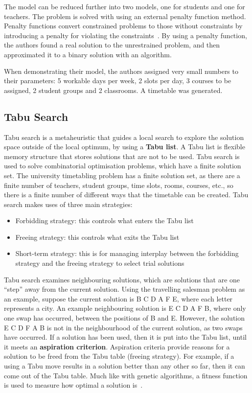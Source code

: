The model can be reduced further into two models, one for students and one for
teachers.
The problem is solved with using an external penalty function method. Penalty
functions convert constrained problems to those without constraints by
introducing a penalty for violating the constraints~\cite{penalty_function}.
By using a penalty function, the authors found a real solution
to the unrestrained problem, and then approximated it to a binary solution with
an algorithm.

When demonstrating their model, the authors assigned very small numbers to their
parameters: 5 workable days per week, 2 slots per day, 3 courses to be assigned,
2 student groups and 2 classrooms. A timetable was generated.

\subsection{Tabu Search}

Tabu search is a metaheuristic that guides a local search to explore the
solution space outside of the local optimum, by using a \textbf{Tabu list}.
A Tabu list is flexible memory structure that stores solutions that are not to
be used.
Tabu search is used to solve combinatorial optimisation problems, which have a
finite solution set.
The university timetabling problem has a finite solution set, as there are a
finite number of teachers, student groups, time slots, rooms, courses, etc., so
there is a finite number of different ways that the timetable can be created.
Tabu search makes uses of three main strategies:
\begin{itemize}
	\item Forbidding strategy: this controls what enters the Tabu list
	\item Freeing strategy: this controls what exits the Tabu list
	\item Short-term strategy: this is for managing interplay between the
		forbidding strategy and the freeing strategy to select trial solutions
\end{itemize}
Tabu search examines neighbouring solutions, which are solutions that are one
“step” away from the current solution.
Using the travelling salesman problem as an example, suppose the current
solution is B C D A F E, where each letter represents a city.
An example neighbouring solution is E C D A F B, where only one swap has
occurred, between the positions of B and E.
However, the solution E C D F A B is not in the neighbourhood of the current
solution, as two swaps have occurred.
If a solution has been used, then it is put into the Tabu list, until it meets
an \textbf{aspiration criterion}.
Aspiration criteria provide reasons for a solution to be freed from the Tabu
table (freeing strategy).
For example, if a using a Tabu move results in a solution better than any other
so far, then it can come out of the Tabu table. Much like with genetic
algorithms, a fitness function is used to measure how optimal a solution 
is~\cite{tabu_video}.

